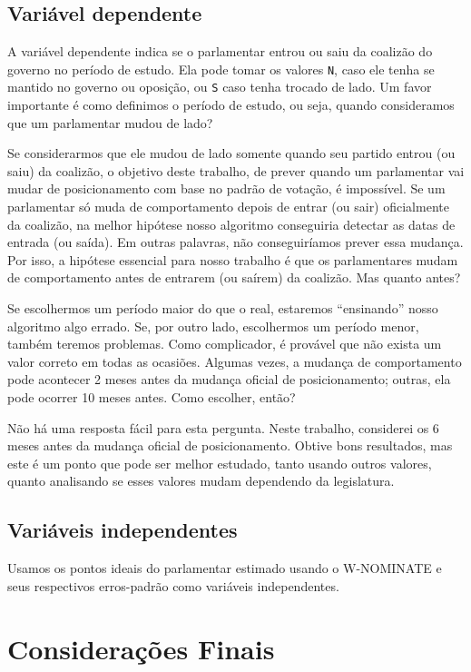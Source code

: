 \documentclass[a4paper,titlepage]{ppgi}\usepackage[]{graphicx}\usepackage[]{color}
\begin{document}
\subsection{Variável dependente}

A variável dependente indica se o parlamentar entrou ou saiu da coalizão do
governo no período de estudo. Ela pode tomar os valores \verb|N|, caso ele
tenha se mantido no governo ou oposição, ou \verb|S| caso tenha trocado de
lado. Um favor importante é como definimos o período de estudo, ou seja, quando
consideramos que um parlamentar mudou de lado?

Se considerarmos que ele mudou de lado somente quando seu partido entrou (ou
saiu) da coalizão, o objetivo deste trabalho, de prever quando um parlamentar
vai mudar de posicionamento com base no padrão de votação, é impossível. Se um
parlamentar só muda de comportamento depois de entrar (ou sair) oficialmente da
coalizão, na melhor hipótese nosso algoritmo conseguiria detectar as datas de
entrada (ou saída). Em outras palavras, não conseguiríamos prever essa mudança.
Por isso, a hipótese essencial para nosso trabalho é que os parlamentares mudam
de comportamento antes de entrarem (ou saírem) da coalizão. Mas quanto antes?

Se escolhermos um período maior do que o real, estaremos ``ensinando'' nosso
algoritmo algo errado. Se, por outro lado, escolhermos um período menor, também
teremos problemas. Como complicador, é provável que não exista um valor correto
em todas as ocasiões. Algumas vezes, a mudança de comportamento pode acontecer
2 meses antes da mudança oficial de posicionamento; outras, ela pode ocorrer 10
meses antes. Como escolher, então?

Não há uma resposta fácil para esta pergunta. Neste trabalho, considerei os 6
meses antes da mudança oficial de posicionamento. Obtive bons resultados, mas
este é um ponto que pode ser melhor estudado, tanto usando outros valores,
quanto analisando se esses valores mudam dependendo da legislatura.

\subsection{Variáveis independentes}

Usamos os pontos ideais do parlamentar estimado usando o W-NOMINATE e seus
respectivos erros-padrão como variáveis independentes.

\section{Considerações Finais}
\end{document}
